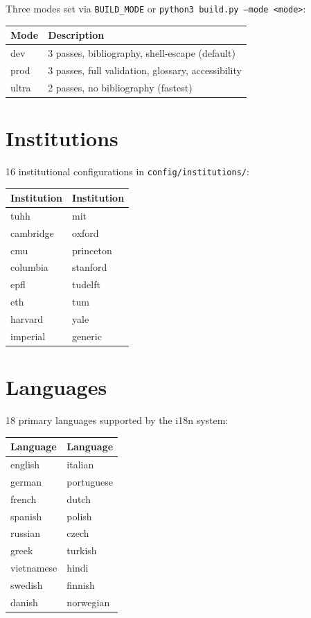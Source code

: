 Three modes set via \texttt{BUILD\_MODE} or
\texttt{python3 build.py --mode <mode>}:

\begin{table}[htbp]
  \centering
  \begin{tabular}{@{} l l @{}}
    \toprule
    \textbf{Mode} & \textbf{Description} \\
    \midrule
    dev & 3 passes, bibliography, shell-escape (default) \\
    prod & 3 passes, full validation, glossary, accessibility \\
    ultra & 2 passes, no bibliography (fastest) \\
    \bottomrule
  \end{tabular}
\end{table}

\section{Institutions}

16 institutional configurations in \texttt{config/institutions/}:

\begin{table}[htbp]
  \centering
  \begin{tabular}{@{} l l @{}}
    \toprule
    \textbf{Institution} & \textbf{Institution} \\
    \midrule
    tuhh & mit \\
    cambridge & oxford \\
    cmu & princeton \\
    columbia & stanford \\
    epfl & tudelft \\
    eth & tum \\
    harvard & yale \\
    imperial & generic \\
    \bottomrule
  \end{tabular}
\end{table}

\section{Languages}

18 primary languages supported by the i18n system:

\begin{table}[htbp]
  \centering
  \begin{tabular}{@{} l l @{}}
    \toprule
    \textbf{Language} & \textbf{Language} \\
    \midrule
    english & italian \\
    german & portuguese \\
    french & dutch \\
    spanish & polish \\
    russian & czech \\
    greek & turkish \\
    vietnamese & hindi \\
    swedish & finnish \\
    danish & norwegian \\
    \bottomrule
  \end{tabular}
\end{table}
